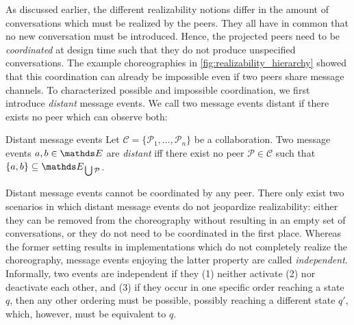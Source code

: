 As discussed earlier, the different realizability notions differ in the amount of conversations which must be realized by the peers. They all have in common that no new conversation must be introduced. Hence, the projected peers need to be \emph{coordinated} at design time such that they do not produce unspecified conversations. The example choreographies in \autoref{fig:realizability_hierarchy} showed that this coordination can already be impossible even if two peers share message channels. To characterized possible and impossible coordination, we first introduce \emph{distant} message events. We call two message events distant if there exists no peer which can observe both:

\begin{definition}{Distant message events}%
Let $\mathcal{C}=\{\mathcal{P}_{1},\ldots,\mathcal{P}_{n}\}$ be a collaboration. Two message events $a,b\in \E$ are \emph{distant} iff there exist no peer $\mathcal{P}\in \mathcal{C}$ such that $\{a,b\}\subseteq \E_{{}\bigcup \mathcal{P}}$.
\end{definition}

Distant message events cannot be coordinated by any peer. There only exist two scenarios in which distant message events do not jeopardize realizability: either they can be removed from the choreography without resulting in an empty set of conversations, or they do not need to be coordinated in the first place. Whereas the former setting results in implementations which do not completely realize the choreography, message events enjoying the latter property are called \emph{independent}. Informally, two events are independent if they (1) neither activate (2) nor deactivate each other, and (3) if they occur in one specific order reaching a state $q$, then any other ordering must be possible, possibly reaching a different state $q'$, which, however, must be equivalent to $q$.


